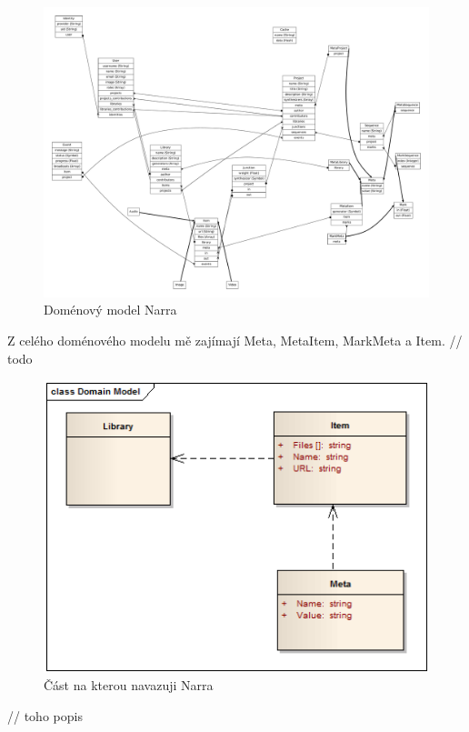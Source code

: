 \begin{figure}[H]
\includegraphics[width=1\textwidth]{./obrazova_priloha/domain_full.pdf}
\caption{Doménový model Narra}
\end{figure}

\par Z celého doménového modelu mě zajímají Meta, MetaItem, MarkMeta a Item.
// todo

\begin{figure}[H]
\includegraphics{./obrazova_priloha/domain_my.png}
\caption{Část na kterou navazuji Narra}
\end{figure}
\par // toho popis
